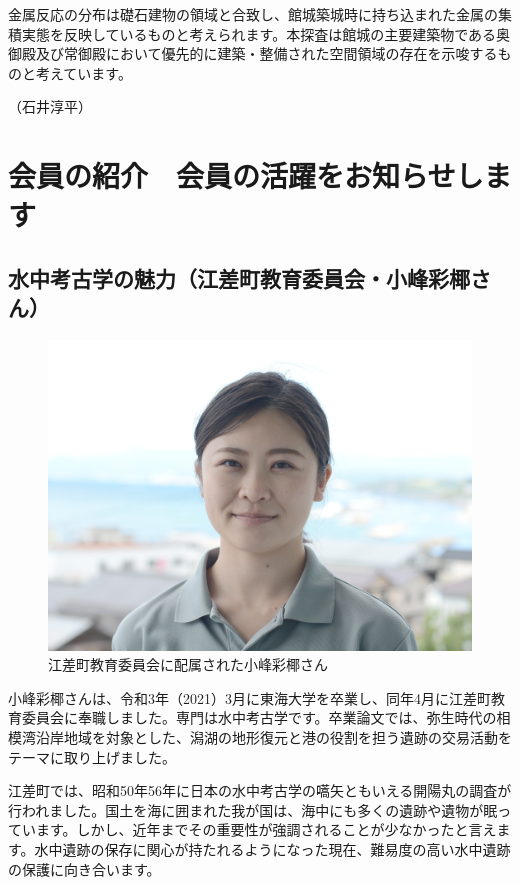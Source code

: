 \documentclass[a4j,11pt,twocolumn,openany]{jsbook}
\begin{document}
金属反応の分布は礎石建物の領域と合致し、館城築城時に持ち込まれた金属の集積実態を反映しているものと考えられます。本探査は館城の主要建築物である奥御殿及び常御殿において優先的に建築・整備された空間領域の存在を示唆するものと考えています。

\begin{flushright}
	（石井淳平）
\end{flushright}


\chapter{会員の紹介　会員の活躍をお知らせします}

\section{水中考古学の魅力（江差町教育委員会・小峰彩椰さん）}

\begin{figure}[h]
	\vspace{-1\baselineskip}
	\centering
	\includegraphics[width=\linewidth]{fig/02_Komine/Komine01.png}
	\caption{江差町教育委員会に配属された小峰彩椰さん}
	\label{}
\end{figure}

小峰彩椰さんは、令和3年（2021）3月に東海大学を卒業し、同年4月に江差町教育委員会に奉職しました。専門は水中考古学です。卒業論文では、弥生時代の相模湾沿岸地域を対象とした、潟湖の地形復元と港の役割を担う遺跡の交易活動をテーマに取り上げました。

江差町では、昭和50年56年に日本の水中考古学の嚆矢ともいえる開陽丸の調査が行われました。国土を海に囲まれた我が国は、海中にも多くの遺跡や遺物が眠っています。しかし、近年までその重要性が強調されることが少なかったと言えます。水中遺跡の保存に関心が持たれるようになった現在、難易度の高い水中遺跡の保護に向き合います。
\end{document}
